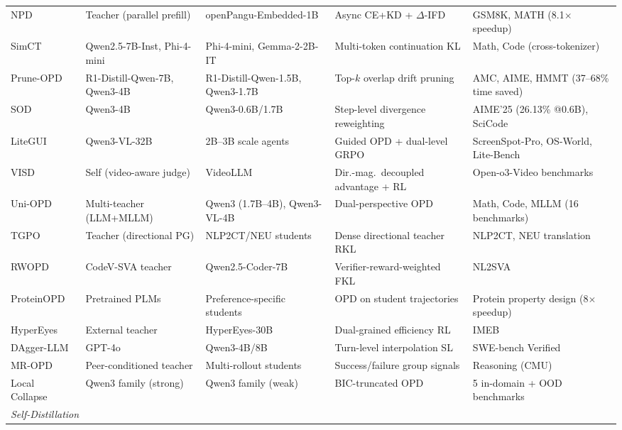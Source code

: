 \documentclass{article} %
\begin{document}
\begin{table}[t]
{\begin{tabular}{@{}lllll@{}}
        NPD~\citep{2605.05940} & Teacher (parallel prefill) & openPangu-Embedded-1B & Async CE+KD + $\Delta$-IFD & GSM8K, MATH (8.1$\times$ speedup) \\
        SimCT~\citep{2605.07711} & Qwen2.5-7B-Inst, Phi-4-mini & Phi-4-mini, Gemma-2-2B-IT & Multi-token continuation KL & Math, Code (cross-tokenizer) \\
        Prune-OPD~\citep{2605.07804} & R1-Distill-Qwen-7B, Qwen3-4B & R1-Distill-Qwen-1.5B, Qwen3-1.7B & Top-$k$ overlap drift pruning & AMC, AIME, HMMT (37--68\% time saved) \\
        SOD~\citep{2605.07725} & Qwen3-4B & Qwen3-0.6B/1.7B & Step-level divergence reweighting & AIME'25 (26.13\% @0.6B), SciCode \\
        LiteGUI~\citep{2605.07505} & Qwen3-VL-32B & 2B--3B scale agents & Guided OPD + dual-level GRPO & ScreenSpot-Pro, OS-World, Lite-Bench \\
        VISD~\citep{2605.06094} & Self (video-aware judge) & VideoLLM & Dir.-mag.\ decoupled advantage + RL & Open-o3-Video benchmarks \\
        Uni-OPD~\citep{2605.03677} & Multi-teacher (LLM+MLLM) & Qwen3 (1.7B--4B), Qwen3-VL-4B & Dual-perspective OPD & Math, Code, MLLM (16 benchmarks) \\
        TGPO~\citep{2605.13230} & Teacher (directional PG) & NLP2CT/NEU students & Dense directional teacher RKL & NLP2CT, NEU translation \\
        RWOPD~\citep{2605.13501} & CodeV-SVA teacher & Qwen2.5-Coder-7B & Verifier-reward-weighted FKL & NL2SVA \\
        ProteinOPD~\citep{2605.10189} & Pretrained PLMs & Preference-specific students & OPD on student trajectories & Protein property design (8$\times$ speedup) \\
        HyperEyes~\citep{2605.07177} & External teacher & HyperEyes-30B & Dual-grained efficiency RL & IMEB \\
        DAgger-LLM~\citep{2605.12913} & GPT-4o & Qwen3-4B/8B & Turn-level interpolation SL & SWE-bench Verified \\
        MR-OPD~\citep{2605.12652} & Peer-conditioned teacher & Multi-rollout students & Success/failure group signals & Reasoning (CMU) \\
        Local Collapse~\citep{2605.13643} & Qwen3 family (strong) & Qwen3 family (weak) & BIC-truncated OPD & 5 in-domain + OOD benchmarks \\
        \midrule
        \multicolumn{5}{l}{\textit{Self-Distillation}} \\

\end{tabular}}
\end{table}
\end{document}
